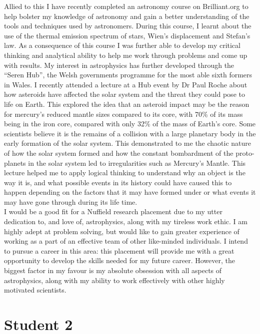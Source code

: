 \documentclass{article}
\begin{document}
Allied to this I have recently completed an astronomy course on Brilliant.org to
help bolster my knowledge of astronomy and gain a better understanding of the
tools and techniques used by astronomers. During this course, I learnt about the
use of the thermal emission spectrum of stars, Wien’s displacement and Stefan’s
law. As a consequence of this course I was further able to develop my critical
thinking and analytical ability to help me work through problems and come up
with results. My interest in astrophysics has further developed through the
“Seren Hub”, the Welsh governments programme for the most able sixth formers in
Wales. I recently attended a lecture at a Hub event by Dr Paul Roche about how
asteroids have affected the solar system and the threat they could pose to life
on Earth. This explored the idea that an asteroid impact may be the reason for
mercury’s reduced mantle sizes compared to its core, with 70\% of its mass being
in the iron core, compared with only 32\% of the mass of Earth’s core. Some
scientists believe it is the remains of a collision with a large planetary body
in the early formation of the solar system. This demonstrated to me the chaotic
nature of how the solar system formed and how the constant bombardment of the
proto-planets in the solar system led to irregularities such as Mercury’s
Mantle. This lecture helped me to apply logical thinking to understand why an
object is the way it is, and what possible events in its history could have
caused this to happen depending on the factors that it may have formed under or
what events it may have gone through during its life time.\\

I would be a good fit for a Nuffield research placement due to my utter
dedication to, and love of, astrophysics, along with my tireless work ethic. I
am highly adept at problem solving, but would like to gain greater experience of
working as a part of an effective team of other like-minded individuals. I
intend to pursue a career in this area: this placement will provide me with a
great opportunity to develop the skills needed for my future career. However,
the biggest factor in my favour is my absolute obsession with all aspects of
astrophysics, along with my ability to work effectively with other highly
motivated scientists.


\section*{Student 2}
\end{document}
